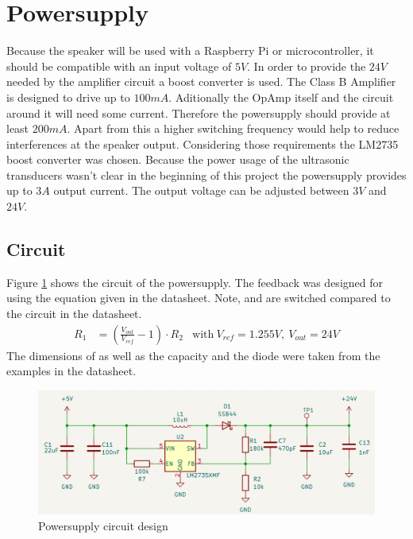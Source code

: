 \section{Powersupply}


Because the speaker will be used with a Raspberry Pi or microcontroller, it should be compatible with an input voltage of $5V$. In order to provide the $24V$ needed by the amplifier circuit a boost converter is used.\p
The Class B Amplifier is designed to drive up to $100mA$. Aditionally the OpAmp itself and the circuit around it will need some current. Therefore the powersupply should provide at least $200mA$. Apart from this a higher switching frequency would help to reduce interferences at the speaker output.\p
%
Considering those requirements the LM2735 boost converter was chosen. Because the power usage of the ultrasonic transducers wasn't clear in the beginning of this project the powersupply provides up to $3A$ output current. The output voltage can be adjusted between $3V$ and $24V$.\cite{texas_instruments_lm2735-q1_2018}

\subsection{Circuit}

Figure \ref{fig:pcb:power_circuit} shows the circuit of the powersupply. The feedback was designed for using the equation given in the datasheet.
Note,  and  are switched compared to the circuit in the datasheet.
%
\begin{align}
  R_1 &= \left(\frac{V_{out}}{V_{ref}} - 1\right) \cdot R_2
  &\mathrm{with~} V_{ref} = 1.255V,~V_{out} = 24V
\end{align}
%
The dimensions of  as well as the capacity  and the diode  were taken from the examples in the datasheet.
%
\begin{figure}
  \centering
  \includegraphics[width=\textwidth]{src/assets/pictures/circuit/powersupply_circuit.png}
  \caption{Powersupply circuit design}\label{fig:pcb:power_circuit}
\end{figure}
